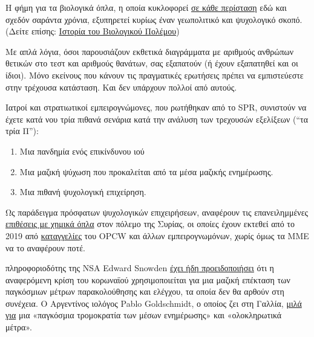 Η φήμη για τα βιολογικά όπλα, η οποία κυκλοφορεί
\href{https://www.wilsoncenter.org/blog-post/operation-denver-kgb-and-stasi-disinformation-regarding-aids}{σε
κάθε περίσταση} εδώ και σχεδόν σαράντα χρόνια, εξυπηρετεί κυρίως έναν
γεωπολιτικό και ψυχολογικό σκοπό. (Δείτε επίσης:
\href{https://www.emedicinehealth.com/biological_warfare/article_em.htm}{Ιστορία
του Βιολογικού Πολέμου})

Με απλά λόγια, όσοι παρουσιάζουν εκθετικά διαγράμματα με αριθμούς
ανθρώπων θετικών στο τεστ και αριθμούς θανάτων, σας εξαπατούν (ή έχουν
εξαπατηθεί και οι ίδιοι). Μόνο εκείνους που κάνουν τις πραγματικές
ερωτήσεις πρέπει να εμπιστεύεστε στην τρέχουσα κατάσταση. Και δεν
υπάρχουν πολλοί από αυτούς.

Ιατροί και στρατιωτικοί εμπειρογνώμονες, που ρωτήθηκαν από το SPR,
συνιστούν να έχετε κατά νου τρία πιθανά σενάρια κατά την ανάλυση των
τρεχουσών εξελίξεων (``τα τρία Π''):

\begin{enumerate}
\def\labelenumi{\arabic{enumi}.}
\tightlist
\item
  Μια πανδημία ενός επικίνδυνου ιού
\item
  Μια μαζική ψύχωση που προκαλείται από τα μέσα μαζικής ενημέρωσης.
\item
  Μια πιθανή ψυχολογική επιχείρηση. 
\end{enumerate}

Ως παράδειγμα πρόσφατων ψυχολογικών επιχειρήσεων, αναφέρουν τις
επανειλημμένες
\href{https://www.globalresearch.ca/the-bbc-saving-syrias-children-documentary-staged-events-fake-video-footage/5470158}{επιθέσεις
με χημικά όπλα} στον πόλεμο της Συρίας, οι οποίες έχουν εκτεθεί από το
2019 από
\href{https://thegrayzone.com/2020/01/22/ian-henderson-opcw-whistleblower-un-no-chemical-attack-douma-syria/}{καταγγελίες}
του OPCW και άλλων εμπειρογνωμόνων, χωρίς όμως τα ΜΜΕ να το αναφέρουν
ποτέ.

 πληροφοριοδότης της NSA Edward Snowden
\href{https://www.youtube.com/watch?v=9we6t2nObbw}{έχει ήδη
προειδοποιήσει} ότι η αναφερόμενη κρίση του κορωναϊού χρησιμοποιείται
για μια μαζική επέκταση των παγκόσμιων μέτρων παρακολούθησης και
ελέγχου, τα οποία δεν θα αρθούν στη συνέχεια. Ο Αργεντίνος ιολόγος Pablo
Goldschmidt, ο οποίος ζει στη Γαλλία,
\href{https://www.infobae.com/coronavirus/2020/03/28/para-un-prestigioso-cientifico-argentino-el-coronavirus-no-merece-que-el-planeta-este-en-un-estado-de-parate-total/}{μιλά
για} μια «παγκόσμια τρομοκρατία των μέσων ενημέρωσης» και «ολοκληρωτικά
μέτρα».

